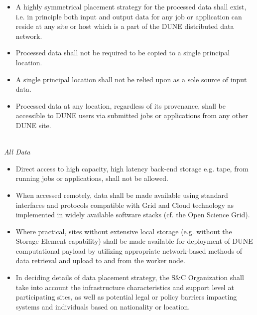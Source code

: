 \begin{itemize}
\item A highly symmetrical placement strategy for the processed data shall exist, i.e. in principle both input and output data for any job or application can reside at any site or host which is a part of the DUNE distributed data network.

\item Processed data shall not be required to be copied to a single principal location.

\item A single principal location shall not be relied upon as a sole source of input data.

\item Processed data at any location, regardless of its provenance,  shall be accessible to DUNE users via submitted jobs or applications from any other DUNE site.
\end{itemize}
\ 
\\
\textit{All Data}
\begin{itemize}
\item Direct access to high capacity, high latency back-end storage e.g. tape, from running jobs or applications, shall not be allowed.

\item When accessed remotely, data shall be made available using standard interfaces and protocols compatible with Grid and Cloud technology as implemented in widely available software stacks (cf. the Open Science Grid).

\item Where practical, sites without extensive local storage (e.g. without the Storage Element capability) shall be made available for deployment of DUNE 
computational payload by utilizing appropriate network-based methods of data retrieval and upload to and from the worker node.

\item In deciding details of data placement strategy, the S\&C Organization shall take into account the infrastructure characteristics and support level at participating sites, as well as potential legal or policy barriers impacting systems and individuals based on nationality or location.


\end{itemize}


